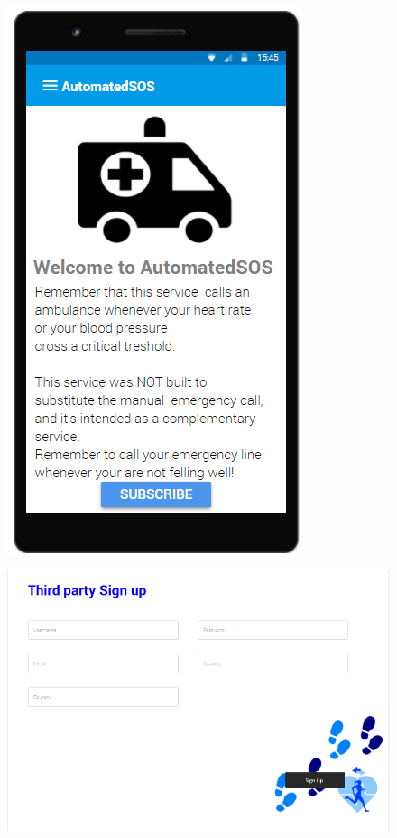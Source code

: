 \begin{figure}[H]
\begin{minipage}{.5\textwidth}
  \includegraphics[width=0.89\linewidth]{resources/Screen/AutomatedSOSIndividual.png}
  \label{fig:App AutomatedSOS}
\end{minipage}
\end{figure}


\begin{figure}[H]
\centering
  \includegraphics[width=0.79\linewidth]{resources/Screen/ThirdPartySignup.png}
  \label{fig:WebApp SignUp}
\end{figure}

